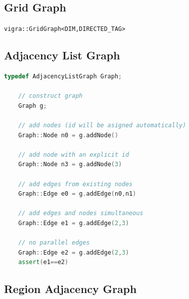 \subsection{Grid Graph} \label{sec:graphs_grid_graph}


    \lstinline{vigra::GridGraph<DIM,DIRECTED_TAG>}

\subsection{Adjacency List Graph} \label{sec:graphs_adjacency_list_graph}


    \begin{minipage}{\textwidth}\vspace{-0.75cm}\begin{lstlisting}[language=c++]
    typedef AdjacencyListGraph Graph;

    // construct graph
    Graph g;

    // add nodes (id will be asigned automatically)
    Graph::Node n0 = g.addNode() 

    // add node with an explicit id
    Graph::Node n3 = g.addNode(3)

    // add edges from existing nodes
    Graph::Edge e0 = g.addEdge(n0,n1)

    // add edges and nodes simultaneous 
    Graph::Edge e1 = g.addEdge(2,3)

    // no parallel edges 
    Graph::Edge e2 = g.addEdge(2,3)
    assert(e1==e2)  
    \end{lstlisting}\end{minipage}\vspace{0.5cm}



\subsection{Region Adjacency Graph} \label{sec:graphs_rag}


